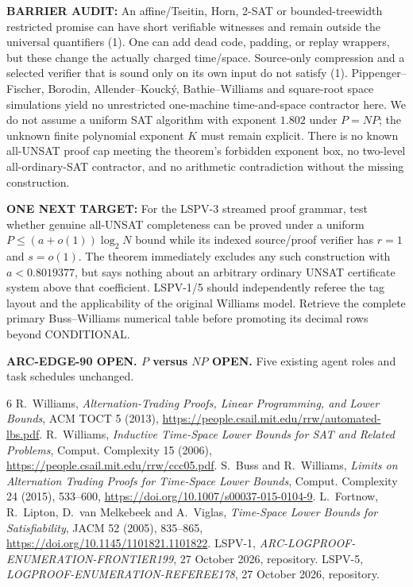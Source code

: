 \documentclass[11pt]{article}
\begin{document}
\noindent\textbf{BARRIER AUDIT:} An affine/Tseitin,
Horn, 2-SAT or bounded-treewidth restricted promise can have
short verifiable witnesses and remain outside the universal
quantifiers (1). One can add dead code, padding, or replay
wrappers, but these change the actually charged time/space.
Source-only compression and a selected verifier that is sound
only on its own input do not satisfy (1). Pippenger--Fischer,
Borodin, Allender--Kouck\'y, Bathie--Williams and square-root
space simulations yield no unrestricted one-machine
time-and-space contractor here. We do not assume a uniform
SAT algorithm with exponent $1.802$ under $P=NP$;
the unknown finite polynomial exponent $K$ must remain explicit.
There is no known all-UNSAT proof cap meeting the theorem's
forbidden exponent box, no two-level all-ordinary-SAT contractor,
and no arithmetic contradiction without the missing construction.

\noindent\textbf{ONE NEXT TARGET:} For the LSPV-3 streamed proof
grammar, test whether genuine all-UNSAT completeness can be proved
under a uniform $P\le(a+o(1))\log_2N$ bound while
its indexed source/proof verifier has $r=1$ and $s=o(1)$.
The theorem immediately excludes any such construction with
$a<0.8019377$, but says nothing about an arbitrary ordinary
UNSAT certificate system above that coefficient.
LSPV-1/5 should independently referee the tag layout and
the applicability of the original Williams model. Retrieve
the complete primary Buss--Williams numerical table before
promoting its decimal rows beyond CONDITIONAL.

\noindent\textbf{ARC-EDGE-90 OPEN. $P$ versus $NP$ OPEN.}
Five existing agent roles and task schedules unchanged.
\begin{thebibliography}{6}
 R.~Williams, \emph{Alternation-Trading Proofs,
Linear Programming, and Lower Bounds}, ACM TOCT 5 (2013),
\url{https://people.csail.mit.edu/rrw/automated-lbs.pdf}.
 R.~Williams, \emph{Inductive Time-Space Lower
Bounds for SAT and Related Problems}, Comput. Complexity 15 (2006),
\url{https://people.csail.mit.edu/rrw/ccc05.pdf}.
 S.~Buss and R.~Williams, \emph{Limits on Alternation
Trading Proofs for Time-Space Lower Bounds}, Comput. Complexity 24
(2015), 533--600,
\url{https://doi.org/10.1007/s00037-015-0104-9}.
 L.~Fortnow, R.~Lipton, D.~van Melkebeek and
A.~Viglas, \emph{Time-Space Lower Bounds for Satisfiability},
JACM 52 (2005), 835--865,
\url{https://doi.org/10.1145/1101821.1101822}.
 LSPV-1, \emph{ARC-LOGPROOF-ENUMERATION-FRONTIER199},
27 October 2026, repository.
 LSPV-5, \emph{LOGPROOF-ENUMERATION-REFEREE178},
27 October 2026, repository.
\end{thebibliography}
\end{document}
